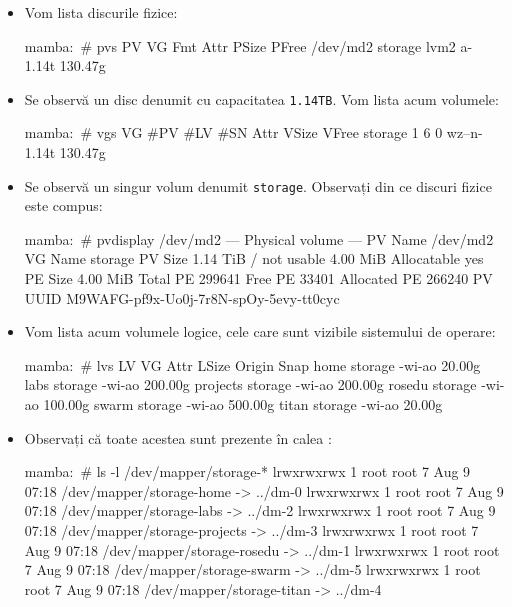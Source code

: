 \begin{itemize}
  \item Vom lista discurile fizice:

\begin{screen}
mamba:~# pvs
  PV         VG      Fmt  Attr PSize PFree
  /dev/md2   storage lvm2 a-   1.14t 130.47g
\end{screen}

        \item Se observă un disc denumit  cu capacitatea \texttt{1.14TB}. Vom
    lista acum volumele:

\begin{screen}
mamba:~# vgs
  VG      #PV #LV #SN Attr   VSize VFree
  storage   1   6   0 wz--n- 1.14t 130.47g
\end{screen}

  \item Se observă un singur volum denumit \texttt{storage}. Observați din
    ce discuri fizice este compus:

\begin{screen}
mamba:~# pvdisplay /dev/md2
  --- Physical volume ---
  PV Name               /dev/md2
  VG Name               storage
  PV Size               1.14 TiB / not usable 4.00 MiB
  Allocatable           yes
  PE Size               4.00 MiB
  Total PE              299641
  Free PE               33401
  Allocated PE          266240
  PV UUID               M9WAFG-pf9x-Uo0j-7r8N-spOy-5evy-tt0cyc
\end{screen}

  \item Vom lista acum volumele logice, cele care sunt vizibile sistemului
    de operare:

\begin{screen}
mamba:~# lvs
  LV       VG      Attr   LSize   Origin Snap%
  home     storage -wi-ao  20.00g
  labs     storage -wi-ao 200.00g
  projects storage -wi-ao 200.00g
  rosedu   storage -wi-ao 100.00g
  swarm    storage -wi-ao 500.00g
  titan    storage -wi-ao  20.00g
\end{screen}


        \item Observați că toate acestea sunt prezente în calea :

\begin{screen}
mamba:~# ls -l /dev/mapper/storage-*
lrwxrwxrwx 1 root root 7 Aug  9 07:18 /dev/mapper/storage-home -> ../dm-0
lrwxrwxrwx 1 root root 7 Aug  9 07:18 /dev/mapper/storage-labs -> ../dm-2
lrwxrwxrwx 1 root root 7 Aug  9 07:18 /dev/mapper/storage-projects -> ../dm-3
lrwxrwxrwx 1 root root 7 Aug  9 07:18 /dev/mapper/storage-rosedu -> ../dm-1
lrwxrwxrwx 1 root root 7 Aug  9 07:18 /dev/mapper/storage-swarm -> ../dm-5
lrwxrwxrwx 1 root root 7 Aug  9 07:18 /dev/mapper/storage-titan -> ../dm-4
\end{screen}

\end{itemize}

